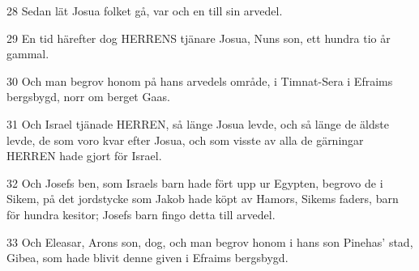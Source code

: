 \par 28 Sedan lät Josua folket gå, var och en till sin arvedel.
\par 29 En tid härefter dog HERRENS tjänare Josua, Nuns son, ett hundra tio år gammal.
\par 30 Och man begrov honom på hans arvedels område, i Timnat-Sera i Efraims bergsbygd, norr om berget Gaas.
\par 31 Och Israel tjänade HERREN, så länge Josua levde, och så länge de äldste levde, de som voro kvar efter Josua, och som visste av alla de gärningar HERREN hade gjort för Israel.
\par 32 Och Josefs ben, som Israels barn hade fört upp ur Egypten, begrovo de i Sikem, på det jordstycke som Jakob hade köpt av Hamors, Sikems faders, barn för hundra kesitor; Josefs barn fingo detta till arvedel.
\par 33 Och Eleasar, Arons son, dog, och man begrov honom i hans son Pinehas' stad, Gibea, som hade blivit denne given i Efraims bergsbygd.


